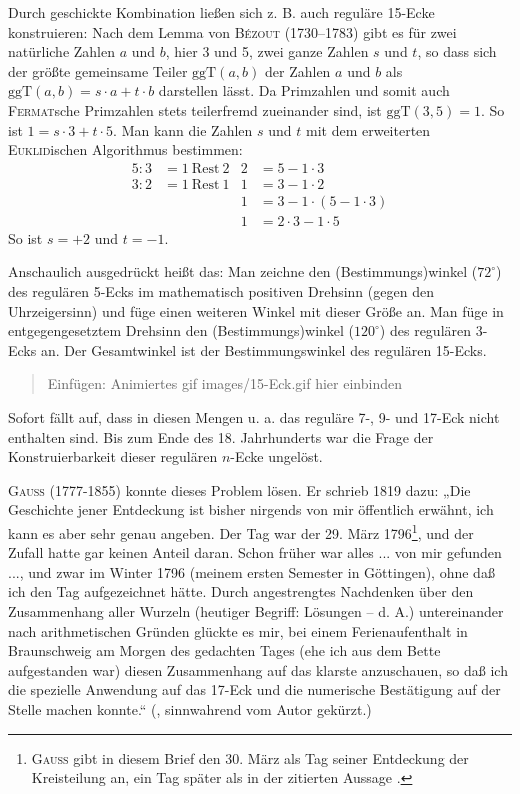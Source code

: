 \documentclass[11pt]{article}
\newcommand{\ggT}{\mathrm{ggT}}
\newcommand{\HGG}[1]{\begin{quote} Einfügen: #1 \end{quote}}
\begin{document}
Durch geschickte Kombination ließen sich z. B. auch reguläre 15-Ecke
konstruieren: Nach dem Lemma von \textsc{Bézout} (1730--1783) gibt es für zwei
natürliche Zahlen $a$ und $b$, hier 3 und 5, zwei ganze Zahlen $s$ und $t$, so
dass sich der größte gemeinsame Teiler $\mathrm{ggT}(a,b)$ der Zahlen $a$ und
$b$ als $\ggT(a,b) = s \cdot a + t \cdot b$ darstellen lässt. Da Primzahlen
und somit auch \textsc{Fermat}sche Primzahlen stets teilerfremd zueinander
sind, ist $\ggT(3,5) = 1$. So ist $1 = s \cdot 3 + t \cdot 5$. Man kann die
Zahlen $s$ und $t$ mit dem erweiterten \textsc{Euklid}ischen Algorithmus
bestimmen:
\begin{align*}  
  5 : 3 &= 1\ \text{Rest}\ 2 & 	2 &= 5 - 1 \cdot 3\\{}
  3 : 2 &= 1\ \text{Rest}\ 1 &	1 &= 3 - 1 \cdot 2\\{}
  && 1 &= 3 - 1 \cdot (5 - 1 \cdot 3)\\{}
  && 1 &= 2 \cdot 3 - 1 \cdot 5
\end{align*}
So ist $s = +2$ und $t = -1$.

Anschaulich ausgedrückt heißt das: Man zeichne den (Bestimmungs)winkel
($72^\circ$) des regulären 5-Ecks im mathematisch positiven Drehsinn (gegen
den Uhrzeigersinn) und füge einen weiteren Winkel mit dieser Größe an. Man
füge in entgegengesetztem Drehsinn den (Bestimmungs)winkel ($120^\circ$) des
regulären 3-Ecks an. Der Gesamtwinkel ist der Bestimmungswinkel des regulären
15-Ecks.

\HGG{Animiertes gif images/15-Eck.gif hier einbinden}

Sofort fällt auf, dass in diesen Mengen u. a. das reguläre 7-, 9- und 17-Eck
nicht enthalten sind. Bis zum Ende des 18. Jahrhunderts war die Frage der
Konstruierbarkeit dieser regulären $n$-Ecke ungelöst.

\textsc{Gauss} (1777-1855) konnte dieses Problem lösen. Er schrieb 1819 dazu:
„Die Geschichte jener Entdeckung ist bisher nirgends von mir öffentlich
erwähnt, ich kann es aber sehr genau angeben. Der Tag war der 29. März
1796\footnote{\textsc{Gauss} gibt in diesem Brief den 30. März als Tag seiner
  Entdeckung der Kreisteilung an, ein Tag später als in der zitierten Aussage
  \cite[S. 219]{Paucker1822}.}, und der Zufall hatte gar keinen Anteil
daran. Schon früher war alles ... von mir gefunden ..., und zwar im Winter
1796 (meinem ersten Semester in Göttingen), ohne daß ich den Tag aufgezeichnet
hätte. Durch angestrengtes Nachdenken über den Zusammenhang aller Wurzeln
(heutiger Begriff: Lösungen -- d. A.)  untereinander nach arithmetischen
Gründen glückte es mir, bei einem Ferienaufenthalt in Braunschweig am Morgen
des gedachten Tages (ehe ich aus dem Bette aufgestanden war) diesen
Zusammenhang auf das klarste anzuschauen, so daß ich die spezielle Anwendung
auf das 17-Eck und die numerische Bestätigung auf der Stelle machen konnte.“
(\cite[S. 15\,f]{GaussTagebuch}, sinnwahrend vom Autor gekürzt.)
\end{document}
